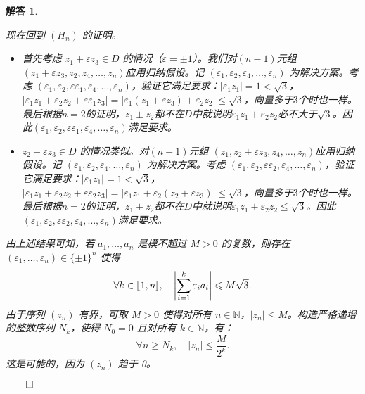 \documentclass[12pt,UTF8]{ctexbook}
\theoremstyle{exercisestyle}
\theoremstyle{solutionstyle}
\newtheorem*{solution*}{解答}
\newenvironment{solution}
  {\begin{solution*}}
  {\hfill\ensuremath{\qed}\end{solution*}}
\begin{document}
\begin{solution}
\begin{subquestions}
\begin{enumerate}[label=\arabic*.]
现在回到 \( (H_n) \) 的证明。
\begin{itemize}
  \item 首先考虑 \( z_1 +\varepsilon z_3 \in D \) 的情况（$\varepsilon = \pm 1$）。我们对\( (n-1) \)元组 \( (z_1 + \varepsilon z_3, z_2, z_4, \ldots, z_n) \)应用归纳假设。记 \( (\varepsilon_1, \varepsilon_2, \varepsilon_4, \ldots, \varepsilon_n) \) 为解决方案。考虑 \( (\varepsilon_1, \varepsilon_2, \varepsilon \varepsilon_1, \varepsilon_4, \ldots, \varepsilon_n) \)，验证它满足要求：\( |\varepsilon_1 z_1| = 1 < \sqrt{3} \)，\( |\varepsilon_1 z_1 + \varepsilon_2 z_2 + \varepsilon \varepsilon_1 z_3| = |\varepsilon_1 (z_1 + \varepsilon z_3) + \varepsilon_2 z_2| \leqslant \sqrt{3} \)，向量多于$3$个时也一样。最后根据$n=2$的证明，\( z_1 \pm z_2 \)都不在$D$中就说明\( \varepsilon_1 z_1 + \varepsilon_2 z_2 \)必不大于$\sqrt{3}$。因此\( (\varepsilon_1, \varepsilon_2, \varepsilon \varepsilon_1, \varepsilon_4, \ldots, \varepsilon_n) \)满足要求。
  \item \( z_2 +\varepsilon z_3 \in D \) 的情况类似。对\( (n-1) \)元组 \( (z_1,z_2 + \varepsilon  z_3, z_4, \ldots, z_n) \)应用归纳假设。记 \( (\varepsilon_1, \varepsilon_2, \varepsilon_4, \ldots, \varepsilon_n) \) 为解决方案。考虑 \( (\varepsilon_1, \varepsilon_2, \varepsilon \varepsilon_2, \varepsilon_4, \ldots, \varepsilon_n) \)，验证它满足要求：\( |\varepsilon_1 z_1| = 1 < \sqrt{3} \)，\( |\varepsilon_1 z_1 + \varepsilon_2 z_2 + \varepsilon \varepsilon_2 z_3| = |\varepsilon_1 z_1 + \varepsilon_2 (z_2 + \varepsilon z_3)| \leqslant \sqrt{3} \)，向量多于$3$个时也一样。最后根据$n=2$的证明，\( z_1 \pm z_2 \)都不在$D$中就说明$ \varepsilon_1 z_1 + \varepsilon_2 z_2 \leqslant\sqrt{3}$。因此\( (\varepsilon_1, \varepsilon_2, \varepsilon \varepsilon_2, \varepsilon_4, \ldots, \varepsilon_n) \)满足要求。
\end{itemize}
\end{enumerate}

\item 由上述结果可知，若 \( a_1, \ldots, a_n \) 是模不超过 \( M > 0 \) 的复数，则存在 \( (\varepsilon_1, \ldots, \varepsilon_n) \in \{\pm 1\}^n \) 使得
\[
\forall k \in [\![1,n]\!], \quad \left| \sum_{i=1}^k \varepsilon_i a_i \right| \leqslant M\sqrt{3}.
\]
由于序列 \( (z_n) \) 有界，可取 \( M > 0 \) 使得对所有 \( n \in \mathbb{N} \)，\( |z_n| \leqslant M \)。构造严格递增的整数序列 \( N_k \)，使得 \( N_0 = 0 \) 且对所有 \( k \in \mathbb{N} \)，有：
\[
\forall n \geq N_k, \quad |z_n| \leqslant \frac{M}{2^k}.
\]
这是可能的，因为 \( (z_n) \) 趋于 0。


\end{subquestions}
\end{solution}
\end{document}

